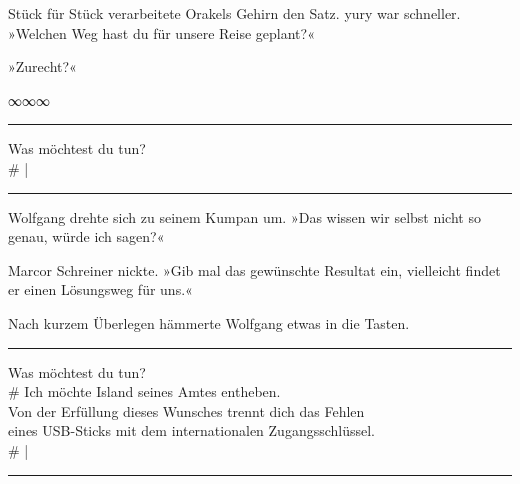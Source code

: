 
Stück für Stück verarbeitete Orakels Gehirn den Satz. yury war schneller. »Welchen Weg hast du für unsere Reise geplant?«


»Zurecht?«


\begin{center}
∞∞∞
\end{center}

\noindent \parbox{\textwidth}{ \vspace{3ex} \hrule \vspace{3ex}

    \begin{footnotesize}
    \begin{ttfamily}

\noindent Was möchtest du tun?\\
\noindent \# |

    \end{ttfamily}
    \end{footnotesize}

\vspace{3ex} \hrule \vspace{3ex} }

Wolfgang drehte sich zu seinem Kumpan um. »Das wissen wir selbst nicht so genau, würde ich sagen?«

Marcor Schreiner nickte. »Gib mal das gewünschte Resultat ein, vielleicht findet er einen Lösungsweg für uns.«

Nach kurzem Überlegen hämmerte Wolfgang etwas in die Tasten.

\noindent \parbox{\textwidth}{ \vspace{3ex} \hrule \vspace{3ex}

    \begin{footnotesize}
    \begin{ttfamily}

\noindent Was möchtest du tun?\\
\noindent \# Ich möchte Island seines Amtes entheben.\\
\noindent Von der Erfüllung dieses Wunsches trennt dich das Fehlen\\
\noindent eines USB-Sticks mit dem internationalen Zugangsschlüssel.\\
\noindent \# |

    \end{ttfamily}
    \end{footnotesize}

\vspace{3ex} \hrule \vspace{3ex} }

